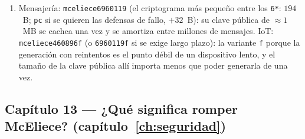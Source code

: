 \documentclass[11pt,a4paper,oneside]{report}
\newcommand{\F}{\mathbb{F}}
\newcommand{\Ftwo}{\F_2}
\begin{document}
\begin{enumerate}[leftmargin=1.9em,itemsep=4pt]
        $\Ftwo^{1547}$. En modo Simply el relleno se ignora: ambas
        producen la \emph{misma} $K$ (un solo valor distinto). En
        modo Narrowly, la cadena con relleno no nulo se rechaza:
        una produce la $K$ legítima y la otra la clave de la rama de
        rechazo. Debe fijarlo el protocolo porque una implementación
        Simply y una Narrowly, mezcladas, discreparían en qué clave
        corresponde a los mismos bytes: es la maleabilidad benigna
        de la figura~\ref{fig:param-narrowly}.
  \item Mensajería: \texttt{mceliece6960119} (el criptograma más
        pequeño entre los \texttt{6*}: $194$~B; \texttt{pc} si se
        quieren las defensas de fallo, $+32$~B): su clave pública de
        $\approx1$~MB se cachea una vez y se amortiza entre millones
        de mensajes. IoT: \texttt{mceliece460896f} (o
        \texttt{6960119f} si se exige largo plazo): la variante
        \texttt{f} porque la generación con reintentos es el punto
        débil de un dispositivo lento, y el tamaño de la clave
        pública allí importa menos que poder generarla de una vez.
\end{enumerate}

\subsection*{Capítulo 13 --- ¿Qué significa romper McEliece?
(capítulo~\ref{ch:seguridad})}
\end{document}

